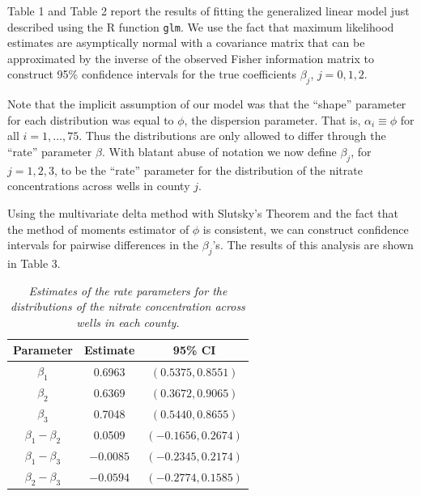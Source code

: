 \documentclass[12pt]{article}
\begin{document}
\begin{enumerate}
    Table 1 and Table 2 report the results of fitting the generalized linear model just described using the R function \texttt{glm}.
    We use the fact that maximum likelihood estimates are asymptically normal with a covariance matrix that can be approximated by the inverse of
    the observed Fisher information matrix to construct 95\% confidence intervals for the true coefficients $\beta_{j}$, $j = 0, 1, 2$.

    Note that the implicit assumption of our model was that the ``shape'' parameter for each distribution was equal to $\phi$, the dispersion
    parameter. That is, $\alpha_i \equiv \phi$ for all $i = 1, \dots, 75$. Thus the distributions are only allowed to differ through the ``rate''
    parameter $\beta$. With blatant abuse of notation we now define $\beta_j$, for $j = 1, 2, 3$, to be the ``rate'' parameter for the distribution of
    the nitrate concentrations across wells in county $j$. 
    
    Using the multivariate delta method with Slutsky's Theorem and the fact that the method of
    moments estimator of $\phi$ is consistent, we can construct confidence intervals for pairwise differences in the $\beta_{j}$'s.
    The results of this analysis are shown in Table 3.

    \begin{table}[h]
      \caption{\emph{Estimates of the rate parameters for the distributions of the nitrate concentration across wells in each county.}}
      \vspace{.5cm}
      \centering
      \begin{tabular}{|c|c|c|}
        \hline
        Parameter & Estimate & 95\% CI \\
        \hline
        $\beta_1$ & 0.6963 & $(0.5375,0.8551)$ \\
        \hline
        $\beta_2$ & 0.6369 & $(0.3672, 0.9065)$ \\
        \hline
        $\beta_3$ & 0.7048 & $(0.5440, 0.8655)$ \\
        \hline
        $\beta_1 - \beta_2$ & 0.0509 & $(-0.1656, 0.2674)$ \\
        \hline
        $\beta_1 - \beta_3$ & $-0.0085$ & $(-0.2345, 0.2174)$ \\
        \hline
        $\beta_2 - \beta_3$ & $-0.0594$ & $(-0.2774, 0.1585)$ \\
        \hline
      \end{tabular}
      \label{tab:3}
    \end{table}


\end{enumerate}
\end{document}
